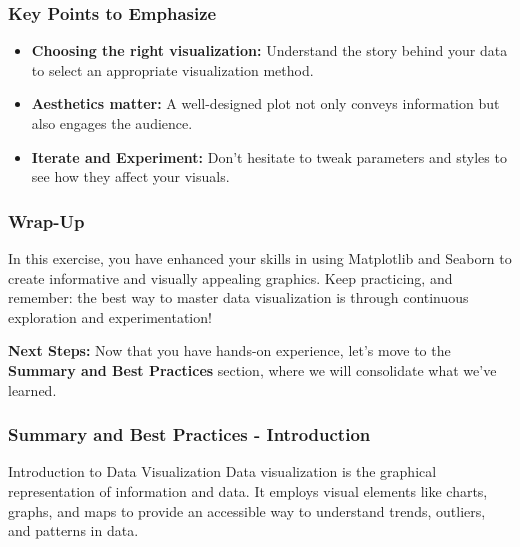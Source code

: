 \documentclass[aspectratio=169]{beamer}
\begin{document}
\begin{frame}
    \frametitle{Key Points to Emphasize}
    \begin{itemize}
        \item \textbf{Choosing the right visualization:} Understand the story behind your data to select an appropriate visualization method.
        \item \textbf{Aesthetics matter:} A well-designed plot not only conveys information but also engages the audience.
        \item \textbf{Iterate and Experiment:} Don't hesitate to tweak parameters and styles to see how they affect your visuals.
    \end{itemize}
\end{frame}

\begin{frame}
    \frametitle{Wrap-Up}
    In this exercise, you have enhanced your skills in using Matplotlib and Seaborn to create informative and visually appealing graphics. Keep practicing, and remember: the best way to master data visualization is through continuous exploration and experimentation!

    \textbf{Next Steps:} Now that you have hands-on experience, let’s move to the \textbf{Summary and Best Practices} section, where we will consolidate what we’ve learned.
\end{frame}

\begin{frame}[fragile]
    \frametitle{Summary and Best Practices - Introduction}
    \begin{block}{Introduction to Data Visualization}
        Data visualization is the graphical representation of information and data. It employs visual elements like charts, graphs, and maps to provide an accessible way to understand trends, outliers, and patterns in data.
    \end{block}
\end{frame}
\end{document}
